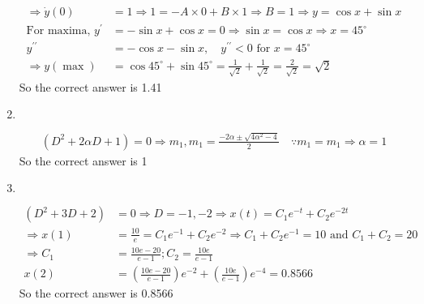 \begin{enumerate}
\begin{answer}
\begin{align*}
		\Rightarrow \dot{y}(0)&=1 \Rightarrow 1=-A \times 0+B \times 1 \Rightarrow B=1 \Rightarrow y=\cos x+\sin x\\
		\text{For maxima, }y^{\prime}&=-\sin x+\cos x=0 \Rightarrow \sin x=\cos x \Rightarrow x=45^{\circ}\\
		y^{\prime \prime}&=-\cos x-\sin x, \quad y^{\prime \prime}<0 \text { for } x=45^{\circ} \\
		\Rightarrow y(\max )&=\cos 45^{\circ}+\sin 45^{\circ}=\frac{1}{\sqrt{2}}+\frac{1}{\sqrt{2}}=\frac{2}{\sqrt{2}}=\sqrt{2}
		\end{align*}
			So the correct answer is 1.41
	\end{answer}
		\item $\left. \right. $
		\begin{answer}
			\begin{align*}
				\left(D^{2}+2 \alpha D+1\right)=0 \Rightarrow m_{1}, m_{1}=\frac{-2 \alpha \pm \sqrt{4 \alpha^{2}-4}}{2} \quad \because m_{1}=m_{1} \Rightarrow \alpha=1
			\end{align*}
			So the correct answer is 1
		\end{answer}
\item $\left. \right. $
	\begin{answer}
		\begin{align*}
		\left(D^{2}+3 D+2\right)&=0 \Rightarrow D=-1,-2 \Rightarrow x(t)=C_{1} e^{-t}+C_{2} e^{-2 t}\\
		 \Rightarrow x(1)&=\frac{10}{e}=C_{1} e^{-1}+C_{2} e^{-2} \Rightarrow C_{1}+C_{2} e^{-1}=10\text{ and }C_{1}+C_{2}=20\\
		\Rightarrow C_{1}&=\frac{10 e-20}{e-1} ; C_{2}=\frac{10 e}{e-1} \\
		x(2)&=\left(\frac{10 e-20}{e-1}\right) e^{-2}+\left(\frac{10 e}{e-1}\right) e^{-4}=0.8566
		\end{align*}
			So the correct answer is 0.8566
	\end{answer}
\end{enumerate}